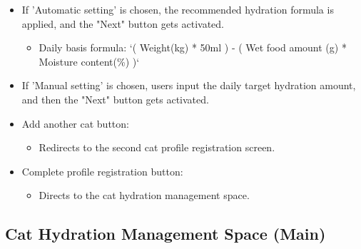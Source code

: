 \documentclass[conference]{IEEEtran}
\begin{document}
\begin{itemize}
\begin{itemize}
\begin{itemize}
            \item If 'Automatic setting' is chosen, the recommended hydration formula is applied, and the "Next" button gets activated.
            \begin{itemize}
                \item Daily basis formula: `( Weight(kg) * 50ml ) - ( Wet food amount (g) * Moisture content(\%) )`
            \end{itemize}
            \item If 'Manual setting' is chosen, users input the daily target hydration amount, and then the "Next" button gets activated.
            \item Add another cat button:
            \begin{itemize}
                \item Redirects to the second cat profile registration screen.
            \end{itemize}
            \item Complete profile registration button:
            \begin{itemize}
                \item Directs to the cat hydration management space.\\
            \end{itemize}
        \end{itemize}
    \end{itemize}
\end{itemize}

\subsection{Cat Hydration Management Space (Main)}
\end{document}

